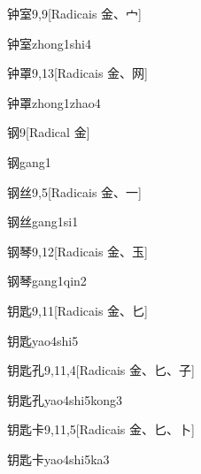 \begin{entry}{钟室}{9,9}[Radicais ⾦、⼧]
  \begin{phonetics}{钟室}{zhong1shi4}
  \end{phonetics}
\end{entry}

\begin{entry}{钟罩}{9,13}[Radicais ⾦、⽹]
  \begin{phonetics}{钟罩}{zhong1zhao4}
  \end{phonetics}
\end{entry}

\begin{entry}{钢}{9}[Radical ⾦]
  \begin{phonetics}{钢}{gang1}
  \end{phonetics}
\end{entry}

\begin{entry}{钢丝}{9,5}[Radicais ⾦、⼀]
  \begin{phonetics}{钢丝}{gang1si1}
  \end{phonetics}
\end{entry}

\begin{entry}{钢琴}{9,12}[Radicais ⾦、⽟]
  \begin{phonetics}{钢琴}{gang1qin2}
  \end{phonetics}
\end{entry}

\begin{entry}{钥匙}{9,11}[Radicais ⾦、⼔]
  \begin{phonetics}{钥匙}{yao4shi5}
  \end{phonetics}
\end{entry}

\begin{entry}{钥匙孔}{9,11,4}[Radicais ⾦、⼔、⼦]
  \begin{phonetics}{钥匙孔}{yao4shi5kong3}
  \end{phonetics}
\end{entry}

\begin{entry}{钥匙卡}{9,11,5}[Radicais ⾦、⼔、⼘]
  \begin{phonetics}{钥匙卡}{yao4shi5ka3}
  \end{phonetics}
\end{entry}

